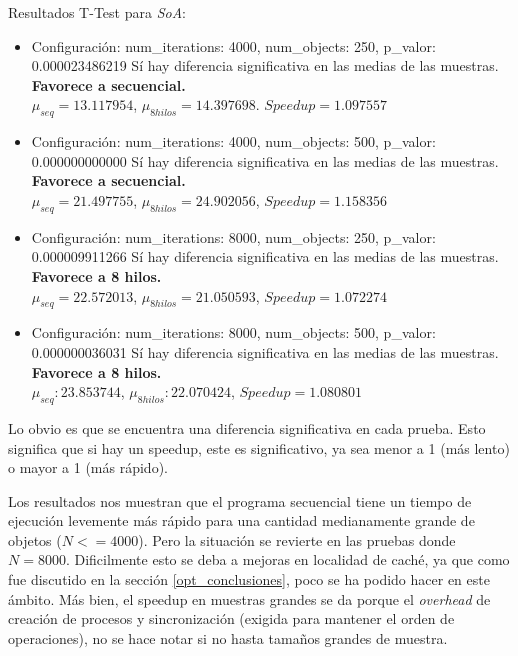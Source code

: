 \documentclass{article}
\begin{document}
Resultados T-Test para \textit{SoA}:

\begin{itemize}
\item Configuración: num\_iterations: 4000, num\_objects: 250, p\_valor: 0.000023486219
	Sí hay diferencia significativa en las medias de las muestras. \textbf{Favorece a secuencial.}\\
		$\mu_{seq} = 13.117954$, $\mu_{8hilos} = 14.397698$. $Speedup = 1.097557$

\item Configuración: num\_iterations: 4000, num\_objects: 500, p\_valor: 0.000000000000
	Sí hay diferencia significativa en las medias de las muestras. \textbf{Favorece a secuencial.}\\
		$\mu_{seq} = 21.497755$, $\mu_{8hilos} = 24.902056$, $Speedup = 1.158356$

\item Configuración: num\_iterations: 8000, num\_objects: 250, p\_valor: 0.000009911266
	Sí hay diferencia significativa en las medias de las muestras. \textbf{Favorece a 8 hilos.}\\
		$\mu_{seq} = 22.572013$, $\mu_{8hilos} = 21.050593$, $Speedup = 1.072274$

\item Configuración: num\_iterations: 8000, num\_objects: 500, p\_valor: 0.000000036031
	Sí hay diferencia significativa en las medias de las muestras. \textbf{Favorece a 8 hilos.}\\
		$\mu_{seq}: 23.853744$, $\mu_{8hilos}: 22.070424$, $Speedup = 1.080801$
\end{itemize}

Lo obvio es que se encuentra una diferencia significativa en cada prueba. Esto significa que si hay un
speedup, este es significativo, ya sea menor a 1 (más lento) o mayor a 1 (más rápido).

Los resultados nos muestran que el programa secuencial tiene un tiempo de ejecución levemente más rápido
para una cantidad medianamente grande de objetos (${N} <= 4000$). Pero la situación se revierte
en las pruebas donde ${N} = 8000$. Dificilmente esto se deba a mejoras en localidad de caché, ya que
como fue discutido en la sección \ref{opt_conclusiones}, poco se ha podido hacer en este ámbito.
Más bien, el speedup en muestras grandes se da porque el \textit{overhead} de creación
de procesos y sincronización (exigida para mantener el orden de operaciones), no se hace notar
si no hasta tamaños grandes de muestra.
\end{document}
